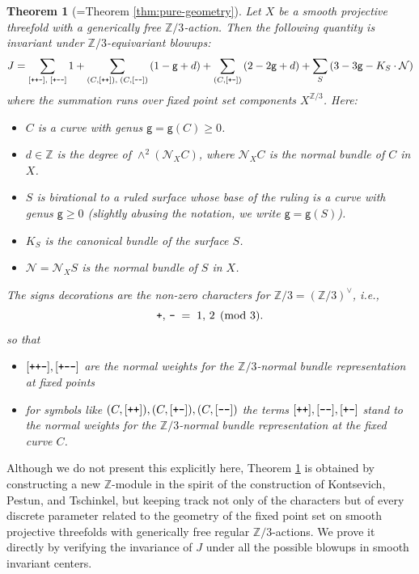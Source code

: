 \documentclass[12pt,a4paper]{amsart}
\newtheorem{Mtheorem}{Theorem}
\theoremstyle{definition}
\theoremstyle{remark}
\newcommand{\lp}{\textup{\texttt{+}}}
\newcommand{\lm}{\textup{\texttt{-}}}
\begin{document}
\begin{Mtheorem}[=Theorem \ref{thm:pure-geometry}]\label{ithm:exotic-invariant}
Let $X$ be a smooth projective threefold with a generically free $\mathbb Z/3$‐action.  Then the following quantity is invariant under \(\mathbb{Z}/3\)-equivariant blowups:
\begin{equation}
  J = 
    \sum_{[\lp\lp\lm],\; [\lp\lm\lm]} 1
    + 
    \sum_{(C,[\lp\lp]),\; (C,[\lm\lm])} \left(1 - \mathsf{g} + d\right)
    +
    \sum_{(C,[\lp\lm])} \left(2 - 2\mathsf{g} + d\right)
    +
    \sum_{S} \left(3 - 3\mathsf{g} - K_S\cdot \mathcal N\right)
\end{equation}
where the summation runs over fixed point set components $X^{\mathbb Z/3}$. Here:
\begin{itemize}
  \item 
   $C$ is a curve with genus \(\mathsf{g}=\mathsf{g}(C) \geq 0\).
  \item 
    \(d \in \mathbb{Z}\) is the degree of \(\wedge^{2}(\mathcal{N}_XC)\), where \(\mathcal{N}_XC\) is the normal bundle of $C$ in $X$.
  \item $S$ is birational to a ruled surface whose base of the ruling is a curve with genus 
    \(\mathsf{g} \geq 0\) (slightly abusing the notation, we write $\mathsf g=\mathsf g(S)$).
  \item 
    \(K_{S}\) is the canonical bundle of the surface \(S\).
  \item 
    \(\mathcal{N}=\mathcal N_X S\) is the normal bundle of \(S\) in $X$.
\end{itemize}
The signs decorations are the non-zero characters for \(\mathbb Z/3 = (\mathbb Z/3)^{\vee}\), i.e.,
\[
  \lp,\,\lm \;=\; 1,\,2 \pmod{3}.
\]
so that
\begin{itemize}
    \item $[\lp\lp\lm], [\lp\lm\lm]$ are the normal weights for the $\mathbb Z/3$-normal bundle representation at fixed points
    \item for symbols like $(C,[\lp\lp]), (C,[\lp\lm]), (C,[\lm\lm])$ the terms $[\lp\lp], [\lm\lm], [\lp\lm]$ stand to the normal weights for the $\mathbb Z/3$-normal bundle representation at the fixed curve $C$.
\end{itemize}\end{Mtheorem}

Although we do not present this explicitly here, Theorem \ref{ithm:exotic-invariant} is obtained by constructing a new $\mathbb Z$-module in the spirit of the construction of Kontsevich, Pestun, and Tschinkel, but keeping track not only of the characters but of every discrete parameter related to the geometry of the fixed point set on smooth projective threefolds with generically free regular $\mathbb Z/3$-actions. We prove it directly by verifying the invariance of $J$ under all the possible blowups in smooth invariant centers. 
\end{document}
